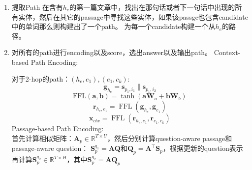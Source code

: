 \documentclass[a4paper,UTF8]{article}
\numberwithin{equation}{section}
\begin{document}
\begin{enumerate}
	\item 提取Path
	在含有$h_e$的第一篇文章中，找出在那句话或者下一句话中出现的所有实体，然后在其它的passage中寻找这些实体，如果该passge也包含candidate中的单词那么则构建出了一个path。
	为每一个candidate构建一个从$h_e$的路径。
	\item 对所有的path进行encoding以及score，选出answer以及输出path。
	\subitem[1] Context-based Path Encoding:

	对于2-hop的path：$(h_e,e_1),(e_1,c_k)$:
	\begin{equation}
		\mathbf{g}_{h_{e}}=\mathbf{s}_{p_{1}, i_{1}} \| \mathbf{s}_{p_{1}, i_{2}}
		\end{equation}
		\begin{equation}
			\mathrm{FFL}(\mathbf{a}, \mathbf{b})=\tanh \left(\mathbf{a} \mathbf{W}_{a}+\mathbf{b} \mathbf{W}_{b}\right)
			\end{equation}
		\begin{equation}
			\mathbf{r}_{h_{e}, e_{1}}=\operatorname{FFL}\left(\mathbf{g}_{h_{e}}, \mathbf{g}_{e_{1}}\right)
			\end{equation}
			\begin{equation}
				\mathbf{x}_{c t x}=\operatorname{FFL}\left(\mathbf{r}_{h_{e}, e_{1}}, \mathbf{r}_{e_{1}, c_{k}}\right)
				\end{equation}
	\subitem[2] Passage-based Path Encoding:\\
	首先计算相似矩阵：$\mathbf{A}_{p} \in \mathbb{R}^{T \times U}$，然后分别计算question-aware passage和passage-aware question：
	$\mathbf{S}_{p}^{q_{1}}=\mathbf{A Q}$和$\mathbf{Q}_{p}=\mathbf{A}^{\top} \mathbf{S}_{p}$，根据更新的question表示再计算$\mathbf{S}_{p}^{q_{2}} \in \mathbb{R}^{T \times H}$，其中$\mathbf{S}_{p}^{q_{2}}=\mathbf{A} \mathbf{Q}_{p}$


\end{enumerate}
\end{document}
